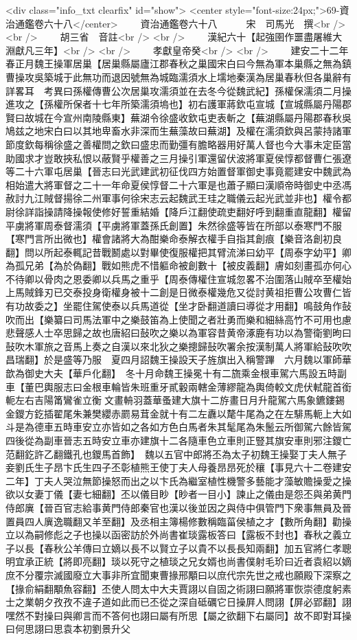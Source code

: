 <div class="info_txt clearfix" id="show">
<center style="font-size:24px;">69-資治通鑑卷六十八</center>
  　　資治通鑑卷六十八　　　宋　司馬光　撰<br />
<br />
　　胡三省　音註<br />
<br />
　　漢紀六十【起強圉作噩盡屠維大淵獻凡三年】<br />
<br />
　　孝獻皇帝癸<br />
<br />
　　建安二十二年春正月魏王操軍居巢【居巢縣屬廬江郡春秋之巢國宋白曰今無為軍本巢縣之無為鎮曹操攻吳築城于此無功而退因號無為城臨濡須水上壖地秦漢為居巢春秋但各巢辭有詳畧耳　考異曰孫權傳曹公次居巢攻濡須並在去冬今從魏武紀】孫權保濡須二月操進攻之【孫權所保者十七年所築濡須塢也】初右護軍蔣欽屯宣城【宣城縣屬丹陽郡賢曰故城在今宣州南陵縣東】蕪湖令徐盛收欽屯吏表斬之【蕪湖縣屬丹陽郡春秋吳鳩兹之地宋白曰以其地卑畜水非深而生蕪藻故曰蕪湖】及權在濡須欽與呂蒙持諸軍節度欽每稱徐盛之善權問之欽曰盛忠而勤彊有膽略器用好萬人督也今大事未定臣當助國求才豈敢挾私恨以蔽賢乎權善之三月操引軍還留伏波將軍夏侯惇都督曹仁張遼等二十六軍屯居巢【晉志曰光武建武初征伐四方始置督軍御史事竟罷建安中魏武為相始遣大將軍督之二十一年命夏侯惇督二十六軍是也蕭子顯曰漢順帝時御史中丞馮赦討九江賊督揚徐二州軍事何徐宋志云起魏武王珪之職儀云起光武並非也】權令都尉徐詳詣操請降操報使修好誓重結婚【降戶江翻使疏吏翻好呼到翻重直龍翻】權留平虜將軍周泰督濡須【平虜將軍蓋孫氏創置】朱然徐盛等皆在所部以泰寒門不服【寒門言所出微也】權會諸將大為酣樂命泰解衣權手自指其創痕【樂音洛創初良翻】問以所起泰輒記昔戰鬭處以對畢使復服權把其臂流涕曰幼平【周泰字幼平】卿為孤兄弟【為於偽翻】戰如熊虎不惜軀命被創數十【被皮義翻】膚如刻畫孤亦何心不待卿以骨肉之恩委卿以兵馬之重乎【周泰傳權住宣城忽畧不治圍落山賊卒至權始上馬賊鋒刃已交泰投身衛權身被十二創是日微泰權幾危又從討黄祖拒曹公攻曹仁皆有功故委之】坐罷住駕使泰以兵馬道從【坐才卧翻道讀曰導從才用翻】鳴鼓角作鼔吹而出【樂纂曰司馬法軍中之樂鼓笛為上使聞之者壯勇而樂和細絲高竹不可用也慮悲聲感人士卒思歸之故也唐紹曰鼔吹之樂以為軍容昔黄帝涿鹿有功以為警衛劉昫曰鼔吹木軍旅之音馬上奏之自漢以來北狄之樂摠歸鼔吹署余按漢制萬人將軍給鼔吹吹昌瑞翻】於是盛等乃服　夏四月詔魏王操設天子旌旗出入稱警蹕　六月魏以軍師華歆為御史大夫【華戶化翻】　冬十月命魏王操冕十有二旒乘金根車駕六馬設五時副車【董巴輿服志曰金根車輪皆朱班重牙貳轂兩轄金薄繆龍為輿倚較文虎伏軾龍首銜軛左右吉陽筩鸞雀立衡文畫輈羽蓋華蚤建大旗十二斿畫日月升龍駕六馬象鑣鏤錫金鑁方釳插翟尾朱兼樊纓赤罽易茸金就十有二左纛以氂牛尾為之在左騑馬軛上大如斗是為德車五時車安立亦皆如之各如方色白馬者朱其髦尾為朱鬛云所御駕六餘皆駕四後從為副車晉志五時安立車亦建旗十二各隨車色立車則正豎其旗安車則邪注鑁亡范翻釳許乙翻鐵孔也鑁馬首飾】　魏以五官中郎將丕為太子初魏王操娶丁夫人無子妾劉氏生子昂卞氏生四子丕彰植熊王使丁夫人母養昂昂死於穰【事見六十二卷建安二年】丁夫人哭泣無節操怒而出之以卞氏為繼室植性機警多藝能才藻敏贍操愛之操欲以女妻丁儀【妻七細翻】丕以儀目眇【眇者一目小】諫止之儀由是怨丕與弟黄門侍郎廙【晉百官志給事黄門侍郎秦官也漢以後並因之與侍中俱管門下衆事無員及晉置員四人廙逸職翻又羊至翻】及丞相主簿楊修數稱臨菑侯植之才【數所角翻】勸操立以為嗣修彪之子也操以函密訪於外尚書崔琰露板答曰【露板不封也】春秋之義立子以長【春秋公羊傳曰立嫡以長不以賢立子以貴不以長長知兩翻】加五官將仁孝聰明宜承正統【將即亮翻】琰以死守之植琰之兄女婿也尚書僕射毛玠曰近者袁紹以嫡庶不分覆宗滅國廢立大事非所宜聞東曹掾邢顒曰以庶代宗先世之戒也願殿下深察之【掾俞絹翻顒魚容翻】丕使人問太中大夫賈詡以自固之術詡曰願將軍恢崇德度躬素士之業朝夕孜孜不違子道如此而已丕從之深自砥礪它日操屛人問詡【屏必郢翻】詡嘿然不對操曰與卿言而不答何也詡曰屬有所思【屬之欲翻下右屬同】故不即對耳操曰何思詡曰思袁本初劉景升父